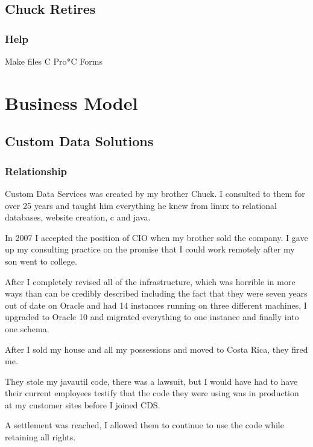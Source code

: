 \documentclass[letterpaper,10pt,english]{sphinxmanual}
\begin{document}
\subsection{Chuck Retires}
\label{\detokenize{Contributions:id23}}

\subsubsection{Help}
\label{\detokenize{Contributions:id24}}
Make files
C
Pro*C
Forms


\section{Business Model}
\label{\detokenize{Contributions:id25}}

\subsection{Custom Data Solutions}
\label{\detokenize{Contributions:custom-data-solutions}}


\subsubsection{Relationship}
\label{\detokenize{Contributions:relationship}}
Custom Data Services was created by my brother Chuck.  I consulted to them for over 25 years and
taught him everything he knew from linux to relational databases, website creation, c and java.

In 2007 I accepted the position of CIO when my brother sold the company.  I gave up my consulting practice
on the promise that I could work remotely after my son went to college.

After I completely revised all of the infrastructure, which was horrible in more ways than can be credibly described
including the fact that they were seven years out of date on Oracle and had 14 instances running on three different
machines, I upgraded to Oracle 10 and migrated everything to one instance and finally into one schema.

After I sold my house and all my possessions and moved to Costa Rica, they fired me.

They stole my javautil code, there was a lawsuit, but I would have had to have their current employees testify that
the code they were using was in production at my customer sites before I joined CDS.

A settlement was reached, I allowed them to continue to use the code while retaining all rights.
\end{document}
